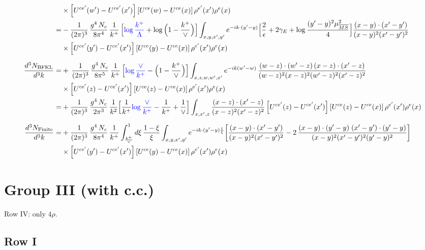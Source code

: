 \documentclass[9pt]{article}
\numberwithin{equation}{section}
\begin{document}
\begin{align}
&\times\left[U^{ce'}(w') - U^{ce'}(x')\right]\left[U^{ce}(w) - U^{ce}(x)\right]\rho^{e'}(x') \rho^{e}(x)\notag \\
= & -\frac{1}{(2\pi)^{3}}\,\frac{g^{4}\,N_{c}}{8\pi^{4}}\,\frac{1}{k^{+}}\,\Big[{\color{blue}\log\frac{k^{+}}{\Lambda}}+\log\Big(1-\frac{k^{+}}{\vee}\Big)\Big]\int_{x,y,x',y'}e^{-ik\cdot(y'-y)}\Big[\frac{2}{\epsilon}+2\gamma_{E}+\log\frac{(y'-y)^{2}\mu^{2}_{\overline{MS}}}{4}\Big]\frac{(x-y)\cdot(x'-y')}{(x-y)^{2}(x'-y')^{2}}\notag\\
&\times\left[U^{ce'}(y') - U^{ce'}(x')\right]\left[U^{ce}(y) - U^{ce}(x)\right]\rho^{e'}(x')\rho^{e}(x)\\[6pt]
\frac{d^{3}N_{\rm BFKL}}{d^{3}k}= &    +\,\frac{1}{(2\pi)^{3}}\,\frac{g^{4}\,N_{c}}{8\pi^{5}}\,\frac{1}{k^{+}}\,\Big[{\color{blue}\log\frac{\vee}{k^{+}}}-\Big(1-\frac{k^{+}}{\vee}\Big)\Big]\int_{x,z,w,w',x'}e^{-ik(w'-w)}\,\frac{(w-z)\cdot (w'-z)\,(x-z)\cdot (x'-z)}{(w-z)^{2}(x-z)^{2}(w'-z)^{2}(x'-z)^{2}}\notag\\
&\times\left[U^{ce'}(z) - U^{ce'}(x')\right]\left[U^{ce}(z) - U^{ce}(x)\right]\rho^{e'}(x') \rho^{e}(x)\notag \\
= & +\frac{1}{(2\pi)^{3}}\,\frac{g^{4}\,N_{c}}{2\pi^{3}}\,\frac{1}{k^{2}}\Big[\frac{1}{k^{+}}{\color{blue}\log\frac{\vee}{k^{+}}}-\frac{1}{k^{+}}+\frac{1}{\vee}\Big]\int_{x,x',z}\frac{(x-z)\cdot(x'-z)}{(x-z)^{2}(x'-z)^{2}}\left[U^{ce'}(z) - U^{ce'}(x')\right]\left[U^{ce}(z) - U^{ce}(x)\right]\rho^{e'}(x')\rho^{e}(x)\\[6pt]
\frac{d^{3}N_{\rm Finite}}{d^{3}k}= &  +\frac{1}{(2\pi)^{3}}\,\frac{g^{4}\,N_{c}}{8\pi^{4}}\,\frac{1}{k^{+}}\int_{\frac{k^{+}}{\vee}}^{1}d\xi\,\frac{1-\xi}{\xi}\int_{x,y,x',y'}e^{-ik\cdot(y'-y)\frac{1}{\xi}}\bigg[\frac{(x-y)\cdot(x'-y')}{(x-y)^{2}(x'-y')^{2}}-2\,\frac{(x-y)\cdot(y'-y)\;(x'-y')\cdot(y'-y)}{(x-y)^{2}(x'-y')^{2}(y'-y)^{2}}\bigg]\notag\\
&\times\left[U^{ce'}(y') - U^{ce'}(x')\right]\left[U^{ce}(y) - U^{ce}(x)\right]\rho^{e'}(x')\rho^{e}(x)
\end{align}

\section{Group III (with c.c.)}
Row IV: only $4\rho$.

\subsection{Row I}
\end{document}
